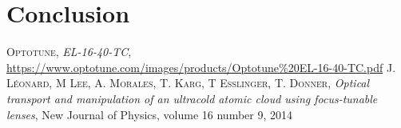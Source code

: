 \documentclass[a4paper,10pt]{article}
\begin{document}
\section{Conclusion}

 \begin{thebibliography}{99}
 \textsc{Optotune}, \textit{EL-16-40-TC}, \url{https://www.optotune.com/images/products/Optotune%20EL-16-40-TC.pdf}
%
 \textsc{J. Léonard, M Lee, A. Morales, T. Karg, T Esslinger, T. Donner}, \textit{Optical transport and manipulation of an ultracold atomic cloud using focus-tunable lenses}, New Journal of Physics, volume 16 number 9, 2014

%
%
%
%
%
 \end{thebibliography}
\end{document}
